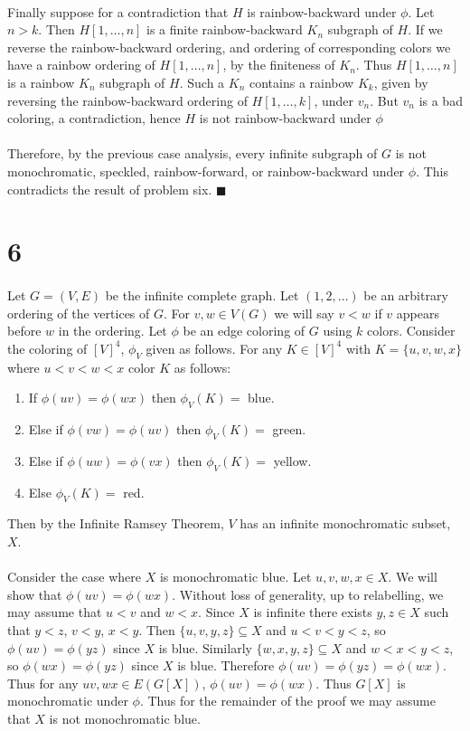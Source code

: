 \documentclass[letterpaper,12pt,oneside,onecolumn]{article}
\begin{document}
\paragraph{}
Finally suppose for a contradiction that $H$ is rainbow-backward under $\phi$. Let $n > k$. Then $H[1,\dots,n]$ is a finite rainbow-backward $K_n$ subgraph of $H$. If we reverse the rainbow-backward ordering, and ordering of corresponding colors we have a rainbow ordering of $H[1,\dots,n]$, by the finiteness of $K_n$. Thus $H[1,\dots, n]$ is a rainbow $K_n$ subgraph of $H$. Such a $K_n$ contains a rainbow $K_k$, given by reversing the rainbow-backward ordering of $H[1,\dots,k]$, under $v_n$. But $v_n$ is a bad coloring, a contradiction, hence $H$ is not rainbow-backward under $\phi$
\paragraph{}
Therefore, by the previous case analysis, every infinite subgraph of $G$ is not monochromatic, speckled, rainbow-forward, or rainbow-backward under $\phi$. This contradicts the result of problem six. $\blacksquare$
\section*{6}
\paragraph{}
Let $G=(V,E)$ be the infinite complete graph. Let $(1,2,\dots)$ be an arbitrary ordering of the vertices of $G$. For $v,w \in V(G)$ we will say $v < w$ if $v$ appears before $w$ in the ordering. Let $\phi$ be an edge coloring of $G$ using $k$ colors. Consider the coloring of $[V]^4$, $\phi_V$ given as follows. For any $K \in [V]^4$ with $K = \{u,v,w,x\}$ where $u<v<w<x$ color $K$ as follows:
\begin{enumerate}
\item If $\phi(uv) = \phi(wx)$ then $\phi_V(K)=$ blue.
\item Else if $\phi(vw)=\phi(uv)$ then $\phi_V(K)=$ green.
\item Else if $\phi(uw) = \phi(vx)$ then $\phi_V(K)=$ yellow.
\item Else $\phi_V(K)=$  red.
\end{enumerate}
Then by the Infinite Ramsey Theorem, $V$ has an infinite monochromatic subset, $X$.
\paragraph{}
Consider the case where $X$ is monochromatic blue. Let $u,v,w,x \in X$. We will show that $\phi(uv) = \phi(wx)$. Without loss of generality, up to relabelling, we may assume that $u<v$ and $w<x$. Since $X$ is infinite there exists $y,z \in X$ such that $y<z$, $v<y$, $x<y$. Then $\{u,v,y,z\} \subseteq X$ and $u<v<y<z$, so $\phi(uv) = \phi(yz)$ since $X$ is blue. Similarly $\{w,x,y,z\} \subseteq X$ and $w<x<y<z$, so $\phi(wx) = \phi(yz)$ since $X$ is blue. Therefore $\phi(uv)=\phi(yz)=\phi(wx)$. Thus for any $uv,wx \in E(G[X])$, $\phi(uv) = \phi(wx)$. Thus $G[X]$ is monochromatic under $\phi$. Thus for the remainder of the proof we may assume that $X$ is not monochromatic blue.
\end{document}
